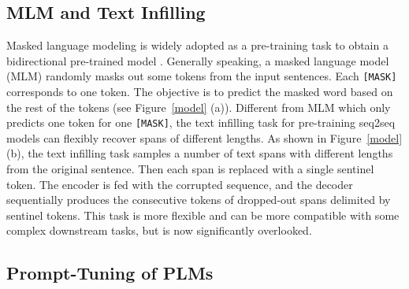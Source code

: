 \documentclass[11pt]{article}
\begin{document}
\subsection{MLM and Text Infilling}
Masked language modeling \cite{taylor1953cloze} is widely adopted as a pre-training task to obtain a bidirectional pre-trained model \cite{devlin-etal-2019-bert, DBLP:journals/corr/abs-1907-11692, DBLP:conf/nips/ConneauL19}. Generally speaking, a masked language model (MLM) randomly masks out some tokens from the input sentences. Each \texttt{[MASK]} corresponds to one token. The objective is to predict the masked word based on the rest of the tokens (see Figure~\ref{model} (a)). Different from MLM which only predicts one token for one \texttt{[MASK]}, the text infilling task for pre-training seq2seq models \cite{DBLP:journals/jmlr/RaffelSRLNMZLL20, lewis-etal-2020-bart} can flexibly recover spans of different lengths. As shown in Figure~\ref{model} (b), the text infilling task samples a number of text spans with different lengths from the original sentence. Then each span is replaced with a single sentinel token. The encoder is fed with the corrupted sequence, and the decoder sequentially produces the consecutive tokens of dropped-out spans delimited by sentinel tokens. This task is more flexible and can be more compatible with some complex downstream tasks, but is now significantly overlooked.










\begin{comment}
	\begin{equation}
		P(y\in\mathcal{Y}|\textbf{x})=\texttt{softmax}(\textbf{W}\boldsymbol{h}_{\scaleto{\texttt{[CLS]} }{6pt}})
	\end{equation}
\end{comment}



\subsection{Prompt-Tuning of PLMs}
\end{document}
